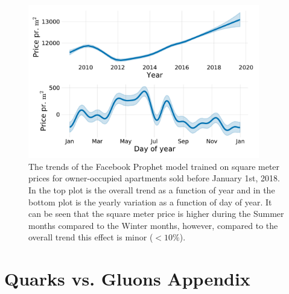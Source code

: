 \documentclass[a4paper, twoside, nobib]{tufte-book}
\begin{document}
\begin{figure}[h!]
  \includegraphics[draft, width=0.9\textwidth]{figures/housing/Villa_v18_cut_all_Ncols_all_prophet_trends.pdf}
  \caption[Prophet Trends]
          {The trends of the Facebook Prophet model trained on square meter prices for owner-occupied apartments sold before January 1st, 2018. In the top plot is the overall trend as a function of year and in the bottom plot is the yearly variation as a function of day of year. It can be seen that the square meter price is higher during the Summer months compared to the Winter months, however, compared to the overall trend this effect is minor ($<10\%$). 
          }
  \label{fig:h:prophet_trends_villa}
\end{figure}







\chapter{Quarks vs. Gluons Appendix}


\backmatter


% 


\printindex
\end{document}
